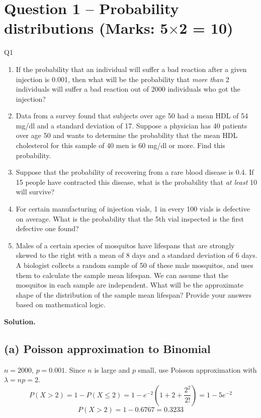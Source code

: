 \documentclass[11pt]{article}
\newcommand{\soln}{\par\noindent\textcolor{acolor}{\textbf{Solution.}}\quad}
\begin{document}
\section{Question 1 -- Probability distributions (Marks: 5$\times$2 = 10)}
\begin{question}{Q1}
\begin{enumerate}[label=(\alph*)]
\item If the probability that an individual will suffer a bad reaction after a given injection is 0.001, then what will be the probability that \emph{more than} 2 individuals will suffer a bad reaction out of 2000 individuals who got the injection?
\item Data from a survey found that subjects over age 50 had a mean HDL of 54 mg/dl and a standard deviation of 17. Suppose a physician has 40 patients over age 50 and wants to determine the probability that the mean HDL cholesterol for this sample of 40 men is 60 mg/dl or more. Find this probability.
\item Suppose that the probability of recovering from a rare blood disease is 0.4. If 15 people have contracted this disease, what is the probability that \emph{at least} 10 will survive?
\item For certain manufacturing of injection vials, 1 in every 100 vials is defective on average. What is the probability that the 5th vial inspected is the first defective one found?
\item Males of a certain species of mosquitos have lifespans that are strongly skewed to the right with a mean of 8 days and a standard deviation of 6 days. A biologist collects a random sample of 50 of these male mosquitos, and uses them to calculate the sample mean lifespan. We can assume that the mosquitos in each sample are independent. What will be the approximate shape of the distribution of the sample mean lifespan? Provide your answers based on mathematical logic.
\end{enumerate}
\end{question}

\soln

\subsection*{(a) Poisson approximation to Binomial}
$n=2000$, $p=0.001$. Since $n$ is large and $p$ small, use Poisson approximation with $\lambda = np = 2$.
\[
P(X > 2) = 1 - P(X\le 2) = 1 - e^{-2}\left(1+2+\frac{2^2}{2!}\right) = 1-5e^{-2}
\]
\[
\boxed{P(X>2) = 1 - 0.6767 = 0.3233}
\]
\end{document}
